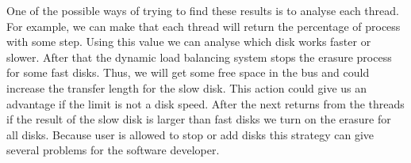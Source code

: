 One of the possible ways of trying to find these results is to analyse each thread. For example, we can make that each thread will return the percentage of process with some step. Using this value we can analyse which disk works faster or slower. After that the dynamic load balancing system stops the erasure process for some fast disks. Thus, we will get some free space in the bus and could increase the transfer length for the slow disk. This action could give us an advantage if the limit is not a disk speed. After the next returns from the threads if the result of the slow disk is larger than fast disks we turn on the erasure for all disks. Because user is allowed to stop or add disks this strategy can give several problems for the software developer.

